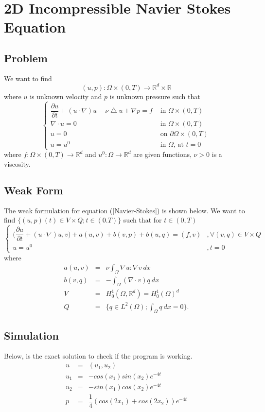 \documentclass[a4paper,10pt]{article}
\newcommand{\R}{\mathbb{R}}
\begin{document}
\section{2D Incompressible Navier Stokes Equation}

\subsection{Problem}
We want to find \[(u,p) : \Omega \times (0,T) \rightarrow \R^d \times \R\] where $ u $ is unknown velocity and $ p $ is unknown pressure such that
\begin{equation}\label{Navier-Stokes}
\begin{cases}
\dfrac{\partial u}{\partial t} + (u \cdot \nabla) u - \nu \bigtriangleup u + \nabla p = f & \text{ in } \Omega \times (0,T)\\
\nabla \cdot u = 0 & \text{ in } \Omega \times (0,T)\\
u = 0 & \text{ on } \partial \Omega \times (0,T)\\
u = u^0 & \text{ in } \Omega \text{, at } t=0
\end{cases}
\end{equation}
where $ f : \Omega \times (0,T) \rightarrow \R^d $ and $ u^0 : \Omega \rightarrow \R^d $ are given functions, $ \nu > 0 $ is a viscosity.

\subsection{Weak Form}
The weak formulation for equation (\ref{Navier-Stokes}) is shown below. We want to find $ \{ (u,p)(t) \in V \times Q ; t \in (0.T) \} $ such that for $ t \in (0,T) $
\begin{equation} \label{NS_Weak}
\begin{cases}
\big( \dfrac{\partial u}{\partial t} + (u \cdot \nabla)u,v \big) + a(u,v) + b(v,p) + b(u,q) = (f,v) & ,\forall(v,q)\in V\times Q \\ u=u^{0} & , t=0
\end{cases}
\end{equation}
where
\begin{eqnarray}\nonumber
a(u,v) &=& \nu \int_{\Omega} \nabla u : \nabla v \ dx \\ \nonumber
b(v,q) &=& - \int_{\Omega} (\nabla \cdot v) q \ dx \\ \nonumber
V &=& H_{0}^{1}(\Omega, \R^d) = H_{0}^{1}(\Omega)^d \\ \nonumber
Q &=& \{ q\in L^2(\Omega) ; \int_{\Omega} q \ dx=0 \}.
\end{eqnarray}

\subsection{Simulation}
Below, is the exact solution to check if the program is working.
\begin{eqnarray} \nonumber
u &=& (u_{1},u_{2})\\ \nonumber
u_{1} &=& -cos(x_{1}) sin(x_{2}) e^{-4t} \\\nonumber
u_{2} &=& -sin(x_{1}) cos(x_{2}) e^{-4t} \\\nonumber
p &=& \dfrac{1}{4} (cos(2x_{1}) + cos(2x_{2})) e^{-4t}
\end{eqnarray}
\end{document}
